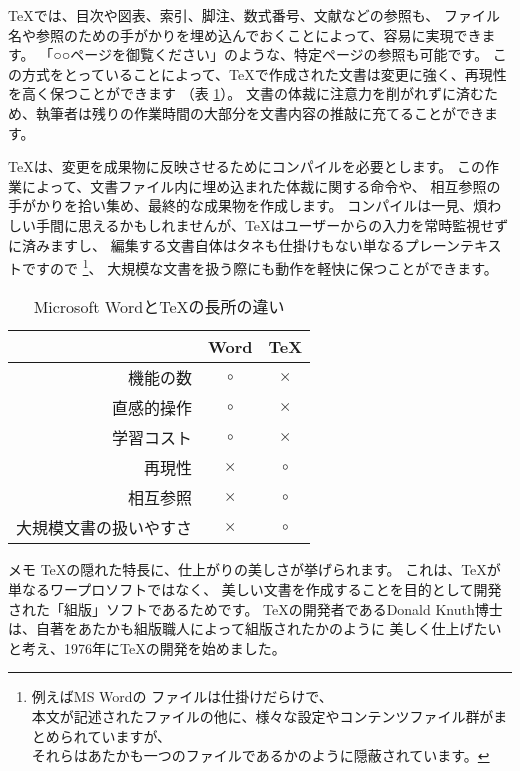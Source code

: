 \documentclass[TeXworkshop]{subfiles}
\begin{document}
\TeX では、目次や図表、索引、脚注、数式番号、文献などの参照も、
ファイル名や参照のための手がかりを埋め込んでおくことによって、容易に実現できます。
「○○ページを御覧ください」のような、特定ページの参照も可能です。
この方式をとっていることによって、\TeX で作成された文書は変更に強く、再現性を高く保つことができます
（表 \ref{table:differences}）。
文書の体裁に注意力を削がれずに済むため、執筆者は残りの作業時間の大部分を文書内容の推敲に充てることができます。

\TeX は、変更を成果物に反映させるためにコンパイルを必要とします。
この作業によって、文書ファイル内に埋め込まれた体裁に関する命令や、
相互参照の手がかりを拾い集め、最終的な成果物を作成します。
コンパイルは一見、煩わしい手間に思えるかもしれませんが、\TeX はユーザーからの入力を常時監視せずに済みますし、
編集する文書自体はタネも仕掛けもない単なるプレーンテキストですので
\footnote{例えばMS Wordの ファイルは仕掛けだらけで、\\
本文が記述されたファイルの他に、様々な設定やコンテンツファイル群がまとめられていますが、\\
それらはあたかも一つのファイルであるかのように隠蔽されています。}、
大規模な文書を扱う際にも動作を軽快に保つことができます。

\begin{table}[h]
 \begin{center}
  \caption{Microsoft Wordと\TeX の長所の違い}
  \label{table:differences}
  \begin{tabular}{rcc}
   & Word & \TeX \\\hline
   機能の数              & $\circ$ & $\times$\\
   直感的操作            & $\circ$ & $\times$\\
   学習コスト            & $\circ$ & $\times$\\
   再現性                & $\times$ & $\circ$ \\
   相互参照              & $\times$ & $\circ$ \\
   大規模文書の扱いやすさ& $\times$ & $\circ$ \\\hline
  \end{tabular}
 \end{center}
\end{table}

\begin{itembox}[l]{メモ}
 \TeX の隠れた特長に、仕上がりの美しさが挙げられます。
 これは、\TeX が単なるワープロソフトではなく、
 美しい文書を作成することを目的として開発された「組版」ソフトであるためです。
 \TeX の開発者であるDonald Knuth博士は、自著をあたかも組版職人によって組版されたかのように
 美しく仕上げたいと考え、1976年に\TeX の開発を始めました。
\end{itembox}
\end{document}
